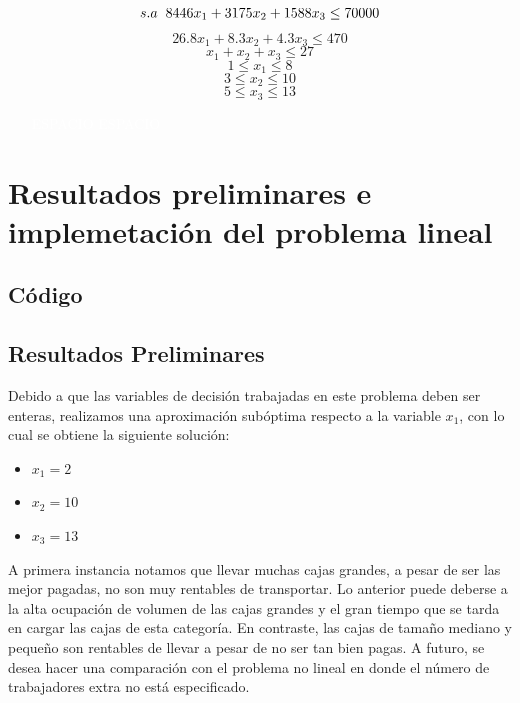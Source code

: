 \documentclass[11pt]{article}
\begin{document}
\[s.a \hspace{0.2cm}8446x_1 + 3175x_2 + 1588x_3 \leq 70000\]
\[26.8x_1 + 8.3x_2 + 4.3x_3 \leq 470\]
\[x_1 + x_2 + x_3 \leq 27\]
\[1 \leq x_1 \leq 8\]
\[3 \leq x_2 \leq 10\]
\[5 \leq x_3 \leq 13\]
\justify

\newpage
\begin{itemize}
    \item[\textcolor{white}{ESPACIO}] \textcolor{white}{ESPACIO}
\end{itemize}

\section{Resultados preliminares e implemetación del problema lineal}

\subsection{Código}
{\Large
\begin{itemize}
    \item {}}

\end{itemize}}

\subsection{Resultados Preliminares}

Debido a que las variables de decisión trabajadas en este problema deben ser enteras, realizamos una aproximación subóptima respecto a la variable $x_1$, con lo cual se obtiene la siguiente solución: 

\begin{itemize}



    \item $x_1 = 2$
    
    \item $x_2 = 10$
    
    \item $x_3 = 13$
    
\end{itemize}

A primera instancia notamos que llevar muchas cajas grandes, a pesar de ser las mejor pagadas, no son muy rentables de transportar. Lo anterior puede deberse a la alta ocupación de volumen de las cajas grandes y el gran tiempo que se tarda en cargar las cajas de esta categoría. En contraste, las cajas de tamaño mediano y pequeño son rentables de llevar a pesar de no ser tan bien pagas. A futuro, se desea hacer una comparación con el problema no lineal en donde el número de trabajadores extra no está especificado.
\end{document}
